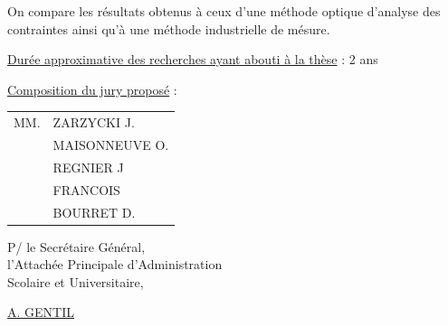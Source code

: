 On compare les résultats obtenus à ceux d'une méthode optique d'analyse des contraintes ainsi qu'à une méthode industrielle de mésure.

\uline{Durée approximative des recherches ayant abouti à la thèse} : 2 ans

\uline{Composition du jury proposé} : \begin{tabular}[t]{ll}
MM. & ZARZYCKI J.\\
& MAISONNEUVE O.\\
& REGNIER J\\
& FRANCOIS\\
& BOURRET D.
\end{tabular}

\begin{flushright}
P/ le Secrétaire Général,\\
l'Attachée Principale d'Administration\\
Scolaire et Universitaire,


\uline{A. GENTIL}
\end{flushright}

